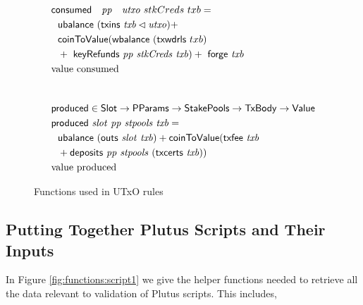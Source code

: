 \begin{figure}[htb]
\begin{align*}
    & \consumed~{pp}~{utxo}~{stkCreds}~{txb} = \\
    & ~~\ubalance{(\txins{txb} \restrictdom \var{utxo})} + \\
    &~~  \fun{coinToValue}(\fun{wbalance}~(\fun{txwdrls}~{txb})~\\
        &~~+~ \keyRefunds{pp}{stkCreds}{txb}) +
        ~\fun{forge}~\var{txb} \\
    & \text{value consumed} \\
    \nextdef
    & \fun{produced} \in \Slot \to \PParams \to \StakePools \to \TxBody \to \Value \\
    & \fun{produced}~\var{slot}~\var{pp}~\var{stpools}~\var{txb} = \\
    &~~\ubalance{(\outs{slot}~{txb})}  + \fun{coinToValue}(\txfee{txb} \\
    &~~+ \deposits{pp}{stpools}~{(\txcerts{txb})})\\
    & \text{value produced}
  \end{align*}
  \caption{Functions used in UTxO rules}
  \label{fig:functions:utxo}
\end{figure}

\clearpage

\subsection{Putting Together Plutus Scripts and Their Inputs}
\label{sec:scripts-inputs}

In Figure \ref{fig:functions:script1} we give the helper functions needed to
retrieve all the data relevant to validation of Plutus scripts.
This includes,

